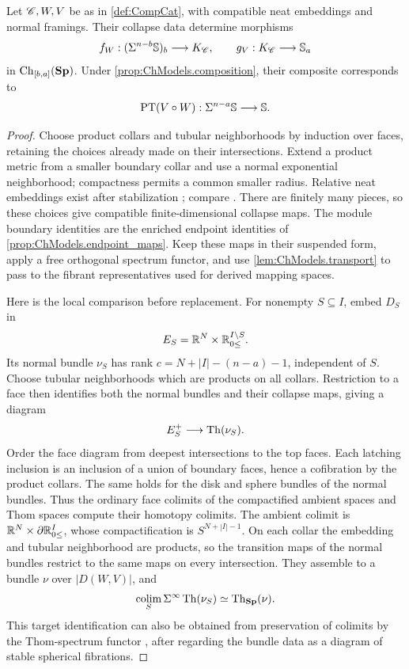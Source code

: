 \begin{prop}\label{prop:flow_PT_composition}
    Let $\mathscr{C},W,V$ be as in \cref{def:CompCat}, with compatible neat embeddings and normal framings. Their collapse data determine morphisms
    \[
        f_W:(\Sigma^{n-b}\mathbb{S})_b\longrightarrow K_{\mathscr{C}},
        \qquad
        g_V:K_{\mathscr{C}}\longrightarrow\mathbb{S}_a
    \]
    in $\operatorname{Ch}_{[b,a]}(\mathbf{Sp})$. Under \cref{prop:ChModels.composition}, their composite corresponds to
    \[
        \operatorname{PT}(V\circ W):
        \Sigma^{n-a}\mathbb{S}\longrightarrow\mathbb{S}.
    \]
\end{prop}
\begin{proof}
    Choose product collars and tubular neighborhoods by induction over faces, retaining the choices already made on their intersections. Extend a product metric from a smaller boundary collar and use a normal exponential neighborhood; compactness permits a common smaller radius. Relative neat embeddings exist after stabilization \cite[Proposition~2.8]{Genauer12}; compare \cite[Appendix~A]{cote2023equivariant}. There are finitely many pieces, so these choices give compatible finite-dimensional collapse maps. The module boundary identities are the enriched endpoint identities of \cref{prop:ChModels.endpoint_maps}. Keep these maps in their suspended form, apply a free orthogonal spectrum functor, and use \cref{lem:ChModels.transport} to pass to the fibrant representatives used for derived mapping spaces.

    Here is the local comparison before replacement. For nonempty $S\subseteq I$, embed $D_S$ in
    \[
        E_S=\mathbb{R}^N\times\mathbb{R}_{0 \leq}^{I\setminus S}.
    \]
    Its normal bundle $\nu_S$ has rank $c=N+|I|-(n-a)-1$, independent of $S$. Choose tubular neighborhoods which are products on all collars. Restriction to a face then identifies both the normal bundles and their collapse maps, giving a diagram
    \[
        E_S^+\longrightarrow\operatorname{Th}(\nu_S).
    \]
    Order the face diagram from deepest intersections to the top faces. Each latching inclusion is an inclusion of a union of boundary faces, hence a cofibration by the product collars. The same holds for the disk and sphere bundles of the normal bundles. Thus the ordinary face colimits of the compactified ambient spaces and Thom spaces compute their homotopy colimits. The ambient colimit is
    $\mathbb{R}^N\times\partial\mathbb{R}_{0 \leq}^I$, whose compactification is $S^{N+|I|-1}$.
    On each collar the embedding and tubular neighborhood are products, so the transition maps of the normal bundles restrict to the same maps on every intersection. They assemble to a bundle $\nu$ over $|D(W,V)|$, and
    \[
        \operatorname*{colim}_S\Sigma^\infty\operatorname{Th}(\nu_S)
        \simeq\operatorname{Th}_{\mathbf{Sp}}(\nu).
    \]
    This target identification can also be obtained from preservation of colimits by the Thom-spectrum functor \cite[Section~3.3]{ABGHR14Thom}, after regarding the bundle data as a diagram of stable spherical fibrations.


\end{proof}
